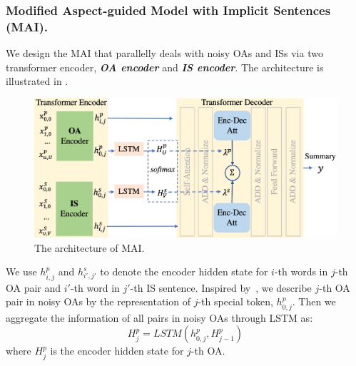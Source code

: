 {\subsubsection{Modified Aspect-guided Model with Implicit Sentences (MAI).}
We design the MAI that parallelly deals with noisy OAs and ISs
via two transformer encoder, \textbf{\em OA encoder} and \textbf{\em IS encoder}. 
The architecture is illustrated in .

\begin{figure}[th]
	\centering
	\includegraphics[width=0.9\linewidth]{./model.pdf}
	\caption{The architecture of MAI.}
	\label{fig:model}
\end{figure}
We use $h^p_{i,j}$ and $h^s_{i',j'}$ to denote the encoder hidden state for $i$-th words in $j$-th OA pair
and $i'$-th word in $j'$-th IS sentence.
Inspired by~\citet{DialogMV2020},
we describe $j$-th OA pair in noisy OAs by 
the representation of $j$-th special token, $h^p_{0,j}$.
Then we aggregate the information of all pairs in noisy OAs through LSTM 
as:
\begin{equation}
	H^p_j = LSTM(h^p_{0,j}, H^p_{j-1})
\end{equation}
where $H^p_j$ is the encoder hidden state for $j$-th OA.
}
